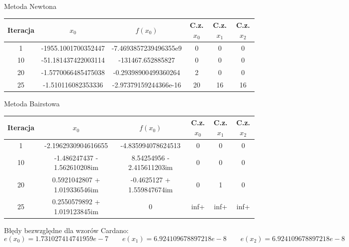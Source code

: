 \documentclass[a4paper]{article}
\begin{document}
    \begin{center}
        Metoda Newtona
    \end{center}
    \begin{center}
        \begin{tabular}{|c|c|c|c|c|c|} 
            \hline
            Iteracja & $x_0$ & $f(x_0)$ & C.z. $x_0$ & C.z. $x_1$ & C.z. $x_2$ \\
            \hline
            1 & -1955.1001700352447 & -7.4693857239496355e9 & 0 & 0 & 0 \\
            \hline
            10 & -51.181437422003114 & -131467.652885827 & 0 & 0 & 0 \\
            \hline
            20 & -1.5770066485475038 & -0.29398900499360264 & 2 & 0 & 0 \\
            \hline
            25 & -1.510116082353336 & -2.97379159244366e-16 & 20 & 16 & 16 \\
            \hline
        \end{tabular}
    \end{center}
        
    \vspace{5mm}

    \begin{center}
        Metoda Bairstowa
    \end{center}
    \begin{center}
        \begin{tabular}{|c|c|c|c|c|c|} 
            \hline
            Iteracja & $x_0$ & $f(x_0)$ & C.z. $x_0$ & C.z. $x_1$ & C.z. $x_2$ \\
            \hline
            1 & -2.1962930904616655 & -4.835994078624513 & 0 & 0 & 0 \\ 
            \hline
            10 & -1.486247437 - 1.562610208im & 8.54254956 - 2.415611203im & 0 & 0 & 0 \\ 
            \hline
            20 & 0.5921042807 + 1.019336546im & -0.4625127 + 1.559847674im & 0 & 1 & 0 \\
            \hline
            25 & 0.2550579892 + 1.019123845im & 0 & inf+ & inf+ & inf+ \\
            \hline
        \end{tabular}
    \end{center}

    \vspace{5mm}

    \begin{center}
        Błędy bezwzględne dla wzorów Cardano:
        \[
            e(x_0) = 1.731027414741959e-7 \qquad e(x_1) = 6.924109678897218e-8 \qquad e(x_2) = 6.924109678897218e-8
        \]
    \end{center}    
\end{document}
